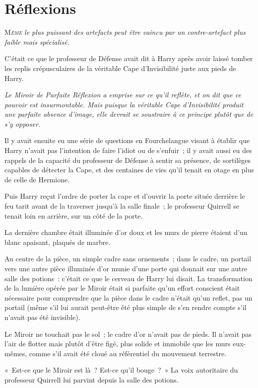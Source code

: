 \chapter{Réflexions}

\lettrine{M}{\emph{ême}} \emph{le plus puissant des artefacts peut être vaincu par un contre-artefact plus faible mais spécialisé.}

C'était ce que le professeur de Défense avait dit à Harry après avoir laissé tomber les replis crépusculaires de la véritable Cape d'Invisibilité juste aux pieds de Harry.

\emph{Le Miroir de Parfaite Réflexion a emprise sur ce qu'il reflète, et on dit que ce pouvoir est insurmontable. Mais puisque la véritable Cape d'Invisibilité produit une parfaite absence d'image, elle devrait se soustraire à ce principe plutôt que de s'y opposer.}

Il y avait ensuite eu une série de questions en Fourchelangue visant à établir que Harry n'avait pas l'intention de faire l'idiot ou de s'enfuir~; il y avait aussi eu des rappels de la capacité du professeur de Défense à sentir sa présence, de sortilèges capables de détecter la Cape, et des centaines de vies qu'il tenait en otage en plus de celle de Hermione.

Puis Harry reçut l'ordre de porter la cape et d'ouvrir la porte située derrière le feu tarit avant de la traverser jusqu'à la salle finale~; le professeur Quirrell se tenait loin en arrière, sur un côté de la porte.

La dernière chambre était illuminée d'or doux et les murs de pierre étaient d'un blanc apaisant, plaqués de marbre.

Au centre de la pièce, un simple cadre sans ornements~; dans le cadre, un portail vers une autre pièce illuminée d'or munie d'une porte qui donnait sur une autre salle des potions~: c'était ce que le cerveau de Harry lui disait. La transformation de la lumière opérée par le Miroir était si parfaite qu'un effort conscient était nécessaire pour comprendre que la pièce dans le cadre n'était qu'un reflet, pas un portail (même s'il lui aurait peut-être été plus simple de s'en rendre compte s'il n'avait pas été invisible).

Le Miroir ne touchait pas le sol~; le cadre d'or n'avait pas de pieds. Il n'avait pas l'air de flotter mais plutôt d'être figé, plus solide et immobile que les murs eux-mêmes, comme s'il avait été cloué au référentiel du mouvement terrestre.

«~Est-ce que le Miroir est là~? Est-ce qu'il bouge~?~» La voix autoritaire du professeur Quirrell lui parvint depuis la salle des potions.

